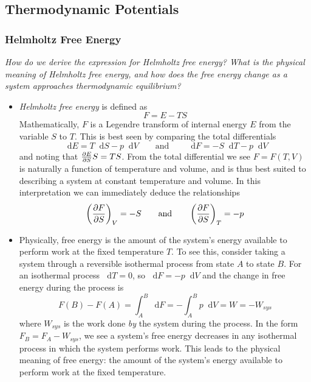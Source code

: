 \documentclass[11pt, a4paper]{article}
\newcommand{\eqtext}[1]{\qquad \text{#1} \qquad}
\newcommand{\diff}{\mathop{}\!\mathrm{d}} %
\newcommand{\pdveval}[3]{\left(\pdv{#1}{#2}\right)_{#3}}
\begin{document}
\subsection{Thermodynamic Potentials}

\subsubsection{Helmholtz Free Energy}
\textit{How do we derive the expression for Helmholtz free energy? What is the physical meaning of Helmholtz free energy, and how does the free energy change as a system approaches thermodynamic equilibrium? }

\begin{itemize}
	\item \textit{Helmholtz free energy} is defined as
	\begin{equation*}
		F = E - TS
	\end{equation*}
	Mathematically, $ F $ is a Legendre transform of internal energy $ E $ from the variable $ S $ to $ T $. This is best seen by comparing the total differentials
	\begin{equation*}
		\diff E = T \diff S - p \diff V \eqtext{and} \diff F = - S \diff T - p \diff V
	\end{equation*}
	and noting that $ \pdv{E}{S}S = TS $. From the total differential we see $ F = F(T, V) $ is naturally a function of temperature and volume, and is thus best suited to describing a system at constant temperature and volume. In this interpretation we can immediately deduce the relationships
	\begin{equation*}
		\pdveval{F}{S}{V} = - S \qquad \text{and} \qquad 	\pdveval{F}{S}{T} = - p
	\end{equation*}
	
	\item Physically, free energy is the amount of the system's energy available to perform work at the fixed temperature $ T $. To see this, consider taking a system through a reversible isothermal process from state $ A $ to state $ B $. For an isothermal process $ \diff T = 0 $, so $ \diff F = - p\diff V $ and the change in free energy during the process is
	\begin{equation*}
		F(B) - F(A) = \int_{A}^{B} \diff F = - \int_{A}^{B} p \diff V = W = -W_{sys}
	\end{equation*}
	where $ W_{sys} $ is the work done \textit{by} the system during the process. In the form $ F_{B} = F_{A} - W_{sys} $, we see a system's free energy decreases in any isothermal process in which the system performs work. This leads to the physical meaning of free energy: the amount of the system's energy available to perform work at the fixed temperature.
	


\end{itemize}
\end{document}
